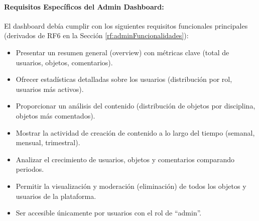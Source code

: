 \paragraph{Requisitos Específicos del Admin Dashboard:}
El dashboard debía cumplir con los siguientes requisitos funcionales principales (derivados de RF6 en la Sección \ref{rf:adminFuncionalidades}):
\begin{itemize}
    \item Presentar un resumen general (overview) con métricas clave (total de usuarios, objetos, comentarios).
    \item Ofrecer estadísticas detalladas sobre los usuarios (distribución por rol, usuarios más activos).
    \item Proporcionar un análisis del contenido (distribución de objetos por disciplina, objetos más comentados).
    \item Mostrar la actividad de creación de contenido a lo largo del tiempo (semanal, mensual, trimestral).
    \item Analizar el crecimiento de usuarios, objetos y comentarios comparando periodos.
    \item Permitir la visualización y moderación (eliminación) de todos los objetos y usuarios de la plataforma.
    \item Ser accesible únicamente por usuarios con el rol de ``admin''.
\end{itemize}

